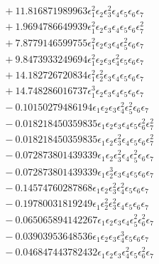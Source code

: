 \documentclass[10pt]{article}
\begin{document}
\begin{align*}
&{}  + 11.816871989963 \epsilon_{1}^{2} \epsilon_{2} \epsilon_{3}^{2} \epsilon_{4} \epsilon_{5} \epsilon_{6} \epsilon_{7} \\
&{}  + 1.9694786649939 \epsilon_{1}^{2} \epsilon_{2} \epsilon_{3} \epsilon_{4} \epsilon_{5} \epsilon_{6} \epsilon_{7}^{2} \\
&{}  + 7.8779146599755 \epsilon_{1}^{2} \epsilon_{2} \epsilon_{3} \epsilon_{4} \epsilon_{5}^{2} \epsilon_{6} \epsilon_{7} \\
&{}  + 9.8473933249694 \epsilon_{1}^{2} \epsilon_{2} \epsilon_{3} \epsilon_{4}^{2} \epsilon_{5} \epsilon_{6} \epsilon_{7} \\
&{}  + 14.182726720834 \epsilon_{1}^{2} \epsilon_{2}^{2} \epsilon_{3} \epsilon_{4} \epsilon_{5} \epsilon_{6} \epsilon_{7} \\
&{}  + 14.748286016737 \epsilon_{1}^{3} \epsilon_{2} \epsilon_{3} \epsilon_{4} \epsilon_{5} \epsilon_{6} \epsilon_{7} \\
&{}  - 0.10150279486194 \epsilon_{1} \epsilon_{2} \epsilon_{3} \epsilon_{4}^{2} \epsilon_{5}^{2} \epsilon_{6} \epsilon_{7} \\
&{}  - 0.018218450359835 \epsilon_{1} \epsilon_{2} \epsilon_{3} \epsilon_{4} \epsilon_{5} \epsilon_{6}^{2} \epsilon_{7}^{2} \\
&{}  - 0.018218450359835 \epsilon_{1} \epsilon_{2} \epsilon_{3}^{2} \epsilon_{4} \epsilon_{5} \epsilon_{6} \epsilon_{7}^{2} \\
&{}  - 0.072873801439339 \epsilon_{1} \epsilon_{2} \epsilon_{3}^{2} \epsilon_{4} \epsilon_{5}^{2} \epsilon_{6} \epsilon_{7} \\
&{}  - 0.072873801439339 \epsilon_{1} \epsilon_{2}^{3} \epsilon_{3} \epsilon_{4} \epsilon_{5} \epsilon_{6} \epsilon_{7} \\
&{}  - 0.14574760287868 \epsilon_{1} \epsilon_{2} \epsilon_{3}^{2} \epsilon_{4}^{2} \epsilon_{5} \epsilon_{6} \epsilon_{7} \\
&{}  - 0.19780031819249 \epsilon_{1} \epsilon_{2}^{2} \epsilon_{3}^{2} \epsilon_{4} \epsilon_{5} \epsilon_{6} \epsilon_{7} \\
&{}  - 0.065065894142267 \epsilon_{1} \epsilon_{2} \epsilon_{3} \epsilon_{4} \epsilon_{5}^{2} \epsilon_{6}^{2} \epsilon_{7} \\
&{}  - 0.03903953648536 \epsilon_{1} \epsilon_{2} \epsilon_{3} \epsilon_{4}^{3} \epsilon_{5} \epsilon_{6} \epsilon_{7} \\
&{}  - 0.046847443782432 \epsilon_{1} \epsilon_{2} \epsilon_{3} \epsilon_{4}^{2} \epsilon_{5} \epsilon_{6}^{2} \epsilon_{7} \\

\end{align*}
\end{document}
